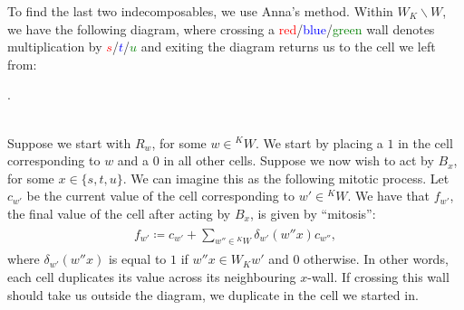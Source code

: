 \begin{example}
\noindent %
To find the last two indecomposables, we use Anna's method. Within $W_K\backslash W$, we have the following diagram, where crossing a \textcolor{red}{red}/\textcolor{blue}{blue}/\textcolor{green}{green} wall denotes multiplication by \textcolor{red}{$s$}/\textcolor{blue}{$t$}/\textcolor{green}{$u$} and exiting the diagram returns us to the cell we left from:\\[-0.75\linespacing]
\begin{center}
.
\end{center}
\noindent\\ Suppose we start with $R_w$, for some $w \in {}^KW$. We start by placing a $1$ in the cell corresponding to $w$ and a $0$ in all other cells. Suppose we now wish to act by $B_x$, for some $x \in \{s, t, u\}$. We can imagine this as the following mitotic process. Let $c_{w'}$ be the current value of the cell corresponding to $w' \in {}^KW$. We have that $f_{w'}$, the final value of the cell after acting by $B_x$, is given by ``mitosis'':
\begin{align*}
\begin{split}
f_{w'} \coloneqq c_{w'} + \sum_{w'' \in {}^KW} \delta_{w'}(w''x)c_{w''},
\end{split}
\end{align*}
\noindent where $\delta_{w'}(w''x)$ is equal to $1$ if $w''x \in W_Kw'$ and $0$ otherwise. In other words, each cell duplicates its value across its neighbouring $x$-wall. If crossing this wall should take us outside the diagram, we duplicate in the cell we started in.
\newpage


\end{example}
